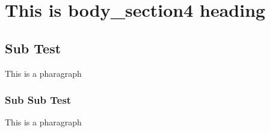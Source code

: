 \section{This is body\_section4 heading}


\blindtext[3]


\subsection{Sub Test}
This is a pharagraph


\subsubsection{Sub Sub Test}
This is a pharagraph


\blindtext[5]


\blindtext[3]


\blindtext[3]